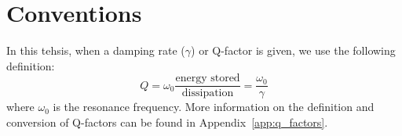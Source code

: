 \chapter*{Conventions}
\label{chap:conventions}
In this tehsis, when a damping rate ($\gamma$) or Q-factor is given, we use the following definition:
\begin{equation*}
    Q = \omega_0 \frac{\text{energy stored}}{\text{dissipation}} = \frac{\omega_0}{\gamma}
\end{equation*}
where $\omega_0$ is the resonance frequency. More information on the definition and conversion of Q-factors can be found in Appendix~\ref{app:q_factors}.
